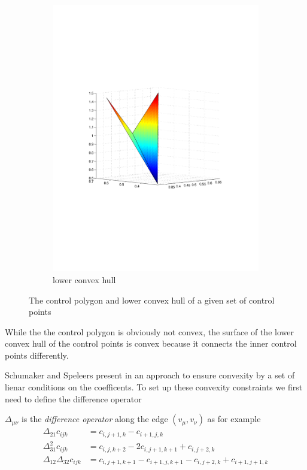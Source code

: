 \begin{figure}[h]
\begin{subfigure}[b]{.5\textwidth}
	\includegraphics[trim=3cm 8cm 3cm 8cm, width=1.\textwidth]{convex_hull2.pdf}
	\caption{lower convex hull}
\end{subfigure}
\caption{The control polygon and lower convex hull of a given set of control points}
\label{fig: diff connectivity}
\end{figure}
While the the control polygon is obviously not convex, the surface of the lower convex hull of the control points is convex because it connects the inner control points differently.

Schumaker and Speleers present in \cite{SS2014} an approach to ensure convexity by a set of lienar conditions on the coefficents. To set up these convexity constraints we first need to define the difference operator
\begin{definition}
	$\Delta_{\mu \nu}$ is the \emph{difference operator} along the edge $(v_\mu, v_\nu)$ as for example
	\begin{align*}
		\Delta_{21} c_{ijk} &= c_{i,j+1,k} -c_{i+1, j,k}  \\
		\Delta_{31}^2 c_{ijk} &= c_{i,j,k+2} -2c_{i, j+1,k+1} +c_{i, j+2,k} \\
		\Delta_{12} \Delta_{32} c_{ijk} &= c_{i,j+1,k+1} -c_{i+1, j,k+1} - c_{i,j+2,k} +c_{i+1, j+1,k}\\	\end{align*}
\end{definition}
 
